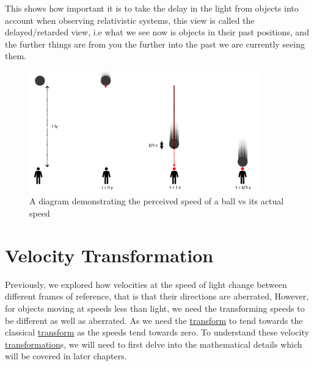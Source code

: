 This shows how important it is to take the delay in the light from objects into account when observing relativistic systems, this view is called the delayed/retarded view, i.e what we see now is objects in their past positions, and the further things are from you the further into the past we are currently seeing them.

\begin{figure}[H]
	\centering
	\includegraphics[width=10cm]{images/pdf/Perceived_speed.pdf}
	\caption{A diagram demonstrating the perceived speed of a ball vs its actual speed}
	\label{fig: perceived vs actual speed}
\end{figure}


\section{Velocity Transformation}

Previously, we explored how velocities at the speed of light change between different frames of reference, that is that their directions are aberrated, However, for objects moving at speeds less than light, we need the transforming speeds to be different as well as aberrated. As we need the \hyperlink{def-transform}{transform} to tend towards the classical \hyperlink{def-transform}{transform} as the speeds tend towards zero. To understand these velocity \hyperlink{def-transform}{transformation}s, we will need to first delve into the mathematical details which will be covered in later chapters.




